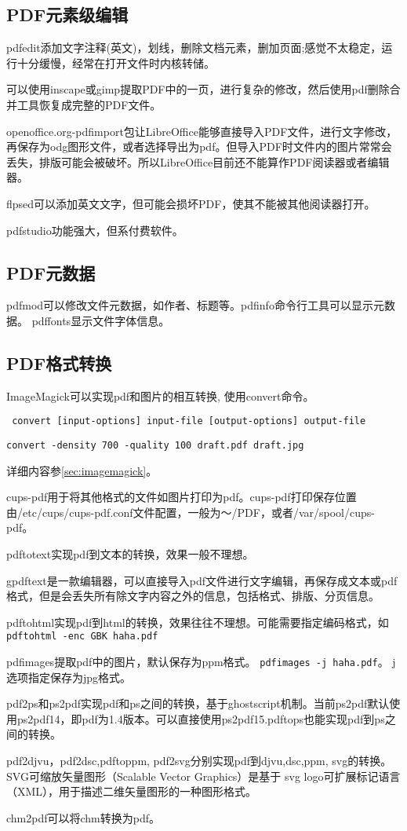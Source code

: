 \subsection{PDF元素级编辑}
pdfedit添加文字注释(英文)，划线，删除文档元素，删加页面;感觉不太稳定，运行十分缓慢，经常在打开文件时内核转储。

可以使用inscape或gimp提取PDF中的一页，进行复杂的修改，然后使用pdf删除合并工具恢复成完整的PDF文件。

openoffice.org-pdfimport包让LibreOffice能够直接导入PDF文件，进行文字修改，再保存为odg图形文件，或者选择导出为pdf。但导入PDF时文件内的图片常常会丢失，排版可能会被破坏。所以LibreOffice目前还不能算作PDF阅读器或者编辑器。

flpsed可以添加英文文字，但可能会损坏PDF，使其不能被其他阅读器打开。

pdfstudio功能强大，但系付费软件。

\subsection{PDF元数据}
pdfmod可以修改文件元数据，如作者、标题等。pdfinfo命令行工具可以显示元数据。
pdffonts显示文件字体信息。

\subsection{PDF格式转换}
ImageMagick可以实现pdf和图片的相互转换, 使用convert命令。
\begin{verbatim}
 convert [input-options] input-file [output-options] output-file
\end{verbatim}

\begin{verbatim}
convert -density 700 -quality 100 draft.pdf draft.jpg
\end{verbatim}
详细内容参\ref{sec:imagemagick}。

cups-pdf用于将其他格式的文件如图片打印为pdf。cups-pdf打印保存位置由/etc/cups/cups-pdf.conf文件配置，一般为～/PDF，或者/var/spool/cups-pdf。

pdftotext实现pdf到文本的转换，效果一般不理想。

gpdftext是一款编辑器，可以直接导入pdf文件进行文字编辑，再保存成文本或pdf格式，但是会丢失所有除文字内容之外的信息，包括格式、排版、分页信息。

pdftohtml实现pdf到html的转换，效果往往不理想。可能需要指定编码格式，如
\verb+pdftohtml -enc GBK haha.pdf +

pdfimages提取pdf中的图片，默认保存为ppm格式。
\verb+pdfimages -j haha.pdf+。
j选项指定保存为jpg格式。

pdf2ps和ps2pdf实现pdf和ps之间的转换，基于ghostscript机制。当前ps2pdf默认使用ps2pdf14，即pdf为1.4版本。可以直接使用ps2pdf15.pdftops也能实现pdf到ps之间的转换。

pdf2djvu，pdf2dsc,pdftoppm, pdf2svg分别实现pdf到djvu,dsc,ppm, svg的转换。SVG可缩放矢量图形（Scalable Vector Graphics）是基于  svg logo可扩展标记语言（XML），用于描述二维矢量图形的一种图形格式。

chm2pdf可以将chm转换为pdf。



